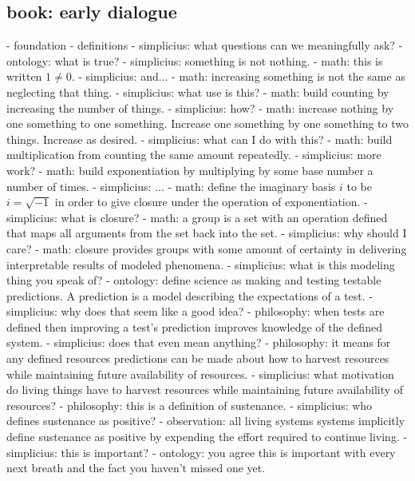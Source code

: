 \begin{enumerate}
\begin{enumerate}
\subsection*{ book: early dialogue }
- foundation
  - definitions
    - simplicius: what questions can we meaningfully ask?
    - ontology: what is true?
    - simplicius: something is not nothing.
    - math: this is written $1 \ne 0.$
    - simplicius: and...
    - math: increasing something is not the same as neglecting that thing.
    - simplicius: what use is this?
    - math: build counting by increasing the number of things.
    - simplicius: how?
    - math: increase nothing by one something to one something. Increase one something by one something to two things. Increase as desired.
    - simplicius: what can I do with this?
    - math: build multiplication from counting the same amount repeatedly.
    - simplicius: more work?
    - math: build exponentiation by multiplying by some base number a number of times.
    - simplicius: ...
    - math: define the imaginary basis $i$ to be $i=\sqrt{-1}$ in order to give closure under the operation of exponentiation.
    - simplicius: what is closure?
    - math: a group is a set with an operation defined that maps all arguments from the set back into the set.
    - simplicius: why should I care?
    - math: closure provides groups with some amount of certainty in delivering interpretable results of modeled phenomena.
    - simplicius: what is this modeling thing you speak of?
    - ontology: define science as making and testing testable predictions. A prediction is a model describing the expectations of a test.
    - simplicius: why does that seem like a good idea?
    - philosophy: when tests are defined then improving a test's prediction improves knowledge of the defined system.
    - simplicius: does that even mean anything?
    - philosophy: it means for any defined resources predictions can be made about how to harvest resources while maintaining future availability of resources.
    - simplicius: what motivation do living things have to harvest resources while maintaining future availability of resources?
    - philosophy: this is a definition of sustenance.
    - simplicius: who defines sustenance as positive?
    - observation: all living systems systems implicitly define sustenance as positive by expending the effort required to continue living.
    - simplicius: this is important?
    - ontology: you agree this is important with every next breath and the fact you haven't missed one yet.

\section*{  }

\end{enumerate}
\end{enumerate}
